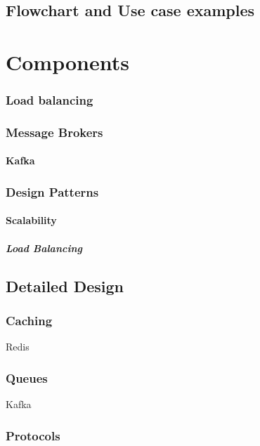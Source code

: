 \documentclass[a4paper, 11pt]{book}
\begin{document}
    \section{Flowchart and Use case examples}


    \chapter{Components}

    \subsection{Load balancing}

    \subsection{Message Brokers}

    \subsubsection{Kafka}

    \subsection{Design Patterns}

    \subsubsection{Scalability}

    \paragraph{Load Balancing}


    \section{Detailed Design}

    \subsection{Caching}
    Redis

    \subsection{Queues}
    Kafka

    \subsection{Protocols}
\end{document}
